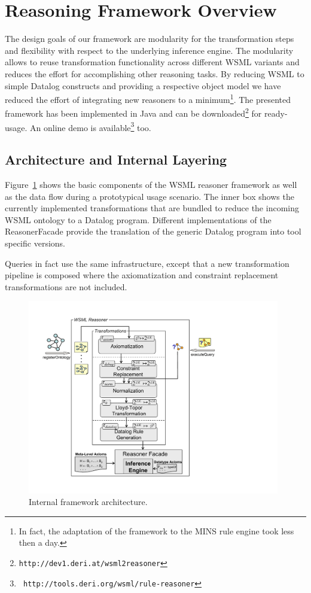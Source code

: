 \section{Reasoning Framework Overview\label{sec:framework}}

The design goals of our framework are modularity for the
transformation steps and flexibility with respect to the
underlying inference engine. The modularity allows to reuse
transformation functionality across different WSML variants and
reduces the effort for accomplishing other reasoning tasks. By
reducing WSML to simple Datalog constructs and providing a
respective object model we have reduced the effort of integrating
new reasoners to a minimum\footnote{In fact, the adaptation of the
framework to the MINS rule engine took less then a day.}. The
presented framework has been implemented in Java and can be
downloaded\footnote{{\tt http://dev1.deri.at/wsml2reasoner}} for
ready-usage. An online demo is available\footnote{\tt
http://tools.deri.org/wsml/rule-reasoner} too.


\subsection{Architecture and Internal Layering}
Figure~\ref{fig:layering} shows the basic components of the WSML
reasoner framework as well as the data flow during a prototypical
usage scenario. The inner box shows the currently implemented
transformations that are bundled to reduce the incoming WSML
ontology to a Datalog program. Different implementations of the
ReasonerFacade provide the translation of the generic Datalog
program into tool specific versions.

Queries in fact use the same infrastructure, except that a new transformation pipeline is
composed where the axiomatization and constraint replacement transformations are not included.

%

\begin{figure}[h]
    \includegraphics[width=11cm]{figures/layering}
    \centering
    \caption{Internal framework architecture. \label{fig:layering}}
\end{figure}


